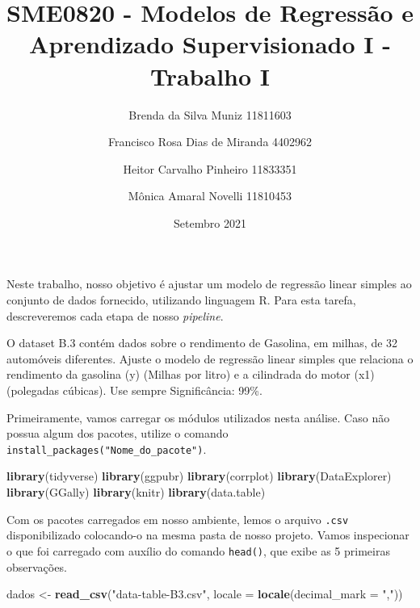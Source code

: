 \documentclass[
]{article}
\title{SME0820 - Modelos de Regressão e Aprendizado Supervisionado I - Trabalho
I}
\author{Brenda da Silva Muniz 11811603 \and Francisco Rosa Dias de Miranda 4402962 \and Heitor Carvalho Pinheiro 11833351 \and Mônica Amaral Novelli 11810453}
\date{Setembro 2021}
\newenvironment{Shaded}{\begin{snugshade}}{\end{snugshade}}
\newcommand{\DataTypeTok}[1]{\textcolor[rgb]{0.13,0.29,0.53}{#1}}
\newcommand{\KeywordTok}[1]{\textcolor[rgb]{0.13,0.29,0.53}{\textbf{#1}}}
\newcommand{\NormalTok}[1]{#1}
\newcommand{\OperatorTok}[1]{\textcolor[rgb]{0.81,0.36,0.00}{\textbf{#1}}}
\newcommand{\StringTok}[1]{\textcolor[rgb]{0.31,0.60,0.02}{#1}}
\begin{document}
\maketitle

Neste trabalho, nosso objetivo é ajustar um modelo de regressão linear
simples ao conjunto de dados fornecido, utilizando linguagem R. Para
esta tarefa, descreveremos cada etapa de nosso \emph{pipeline}.

O dataset B.3 contém dados sobre o rendimento de Gasolina, em milhas, de
32 automóveis diferentes. Ajuste o modelo de regressão linear simples
que relaciona o rendimento da gasolina (y) (Milhas por litro) e a
cilindrada do motor (x1) (polegadas cúbicas). Use sempre Significância:
99\%.

Primeiramente, vamos carregar os módulos utilizados nesta análise. Caso
não possua algum dos pacotes, utilize o comando
\texttt{install\_packages("Nome\_do\_pacote")}.

\begin{Shaded}
\begin{Highlighting}[]
\KeywordTok{library}\NormalTok{(tidyverse)}
\KeywordTok{library}\NormalTok{(ggpubr)}
\KeywordTok{library}\NormalTok{(corrplot)}
\KeywordTok{library}\NormalTok{(DataExplorer)}
\KeywordTok{library}\NormalTok{(GGally)}
\KeywordTok{library}\NormalTok{(knitr)}
\KeywordTok{library}\NormalTok{(data.table)}
\end{Highlighting}
\end{Shaded}

Com os pacotes carregados em nosso ambiente, lemos o arquivo
\texttt{.csv} disponibilizado colocando-o na mesma pasta de nosso
projeto. Vamos inspecionar o que foi carregado com auxílio do comando
\texttt{head()}, que exibe as 5 primeiras observações.

\begin{Shaded}
\begin{Highlighting}[]
\NormalTok{dados <-}\StringTok{ }\KeywordTok{read_csv}\NormalTok{(}\StringTok{"data-table-B3.csv"}\NormalTok{, }\DataTypeTok{locale =} \KeywordTok{locale}\NormalTok{(}\DataTypeTok{decimal_mark =} \StringTok{","}\NormalTok{))}
\end{Highlighting}
\end{Shaded}

\begin{Shaded}
\end{Shaded}
\end{document}
